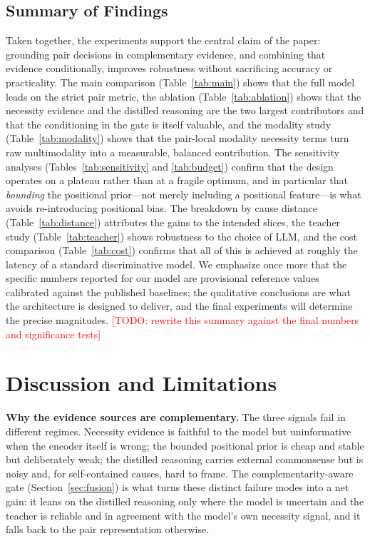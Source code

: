 \documentclass[journal]{IEEEtran}
\newcommand{\todo}[1]{\textcolor{red}{[TODO: #1]}}
\begin{document}
\subsection{Summary of Findings}
Taken together, the experiments support the central claim of the paper: grounding pair
decisions in complementary evidence, and combining that evidence conditionally, improves
robustness without sacrificing accuracy or practicality. The main comparison
(Table~\ref{tab:main}) shows that the full model leads on the strict pair metric, the ablation
(Table~\ref{tab:ablation}) shows that the necessity evidence and the distilled reasoning are
the two largest contributors and that the conditioning in the gate is itself valuable, and the
modality study (Table~\ref{tab:modality}) shows that the pair-local modality necessity terms
turn raw multimodality into a measurable, balanced contribution. The sensitivity analyses
(Tables~\ref{tab:sensitivity} and \ref{tab:budget}) confirm that the design operates on a
plateau rather than at a fragile optimum, and in particular that \emph{bounding} the positional
prior---not merely including a positional feature---is what avoids re-introducing positional
bias. The breakdown by cause distance (Table~\ref{tab:distance}) attributes the gains to the
intended slices, the teacher study (Table~\ref{tab:teacher}) shows robustness to the choice of
LLM, and the cost comparison (Table~\ref{tab:cost}) confirms that all of this is achieved at
roughly the latency of a standard discriminative model. We emphasize once more that the
specific numbers reported for our model are provisional reference values calibrated against
the published baselines; the qualitative conclusions are what the architecture is designed to
deliver, and the final experiments will determine the precise magnitudes.
\todo{rewrite this summary against the final numbers and significance tests}

\section{Discussion and Limitations}
\label{sec:discussion}
\textbf{Why the evidence sources are complementary.} The three signals fail in different
regimes. Necessity evidence is faithful to the model but uninformative when the encoder itself
is wrong; the bounded positional prior is cheap and stable but deliberately weak; the distilled
reasoning carries external commonsense but is noisy and, for self-contained causes, hard to
frame. The complementarity-aware gate (Section~\ref{sec:fusion}) is what turns these distinct
failure modes into a net gain: it leans on the distilled reasoning only where the model is
uncertain and the teacher is reliable and in agreement with the model's own necessity signal,
and it falls back to the pair representation otherwise.
\end{document}
